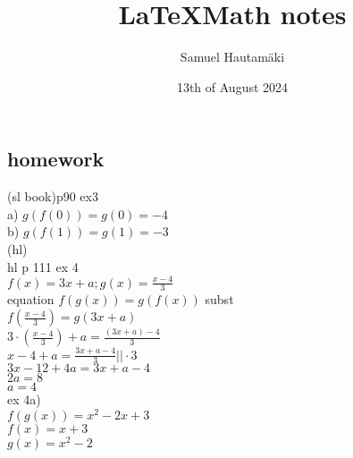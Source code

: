 \documentclass{article}
\title{\LaTeX Math notes}
\author{Samuel Hautamäki}
\date{13th of August 2024}
\begin{document}
  \maketitle
   
  \subsection{homework}
  (sl book)p90 ex3\\
  a) $g(f(0))=g(0)=-4$\\
  b) $g(f(1))=g(1)=-3$\\
  (hl)\\
  hl p 111 ex 4\\
  $f(x)=3x+a;g(x)=\frac{x-4}{3}$\\
  equation $f(g(x)) = g(f(x))$ subst\\
  $f(\frac{x-4}{3})=g(3x+a)$\\
  $3\cdot(\frac{x-4}{3})+a=\frac{(3x+a)-4}{3}$\\
  $x-4+a=\frac{3x+a-4}{3} || \cdot3$\\
  $3x-12+4a=3x+a-4$\\
  $2a=8$\\
  $a=4$\\
  ex 4a) \\
  $f(g(x))=x^2-2x+3$ \\
  $f(x)=x+3$\\
  $g(x)=x^2-2$\\
\end{document}
